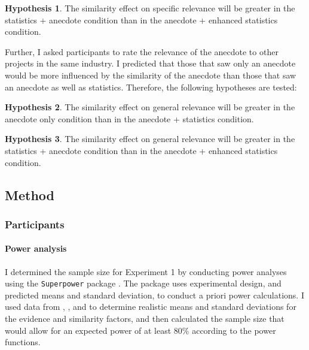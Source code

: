 \documentclass[a4paper, nobind, dvipsnames]{templates/ociamthesis}
\theoremstyle{definition}
\theoremstyle{definition}
\theoremstyle{definition}
\theoremstyle{definition}
\newtheorem{hypothesis}{Hypothesis}[chapter]
\theoremstyle{remark}
\begin{document}
\begin{hypothesis}
\protect\hypertarget{hyp:relevance-specific-enhanced-anecdotes-1}{}{\label{hyp:relevance-specific-enhanced-anecdotes-1} }The similarity effect on specific relevance will be greater in the statistics +
anecdote condition than in the anecdote + enhanced statistics condition.
\end{hypothesis}

Further, I asked participants to rate the relevance of the anecdote to other
projects in the same industry. I predicted that those that saw only an anecdote
would be more influenced by the similarity of the anecdote than those that saw
an anecdote as well as statistics. Therefore, the following hypotheses are
tested:

\begin{hypothesis}
\protect\hypertarget{hyp:relevance-general-anecdotes-1}{}{\label{hyp:relevance-general-anecdotes-1} }The similarity effect on general relevance will be greater in the anecdote only
condition than in the anecdote + statistics condition.
\end{hypothesis}

\begin{hypothesis}
\protect\hypertarget{hyp:relevance-general-enhanced-anecdotes-1}{}{\label{hyp:relevance-general-enhanced-anecdotes-1} }The similarity effect on general relevance will be greater in the statistics +
anecdote condition than in the anecdote + enhanced statistics condition.
\end{hypothesis}

\hypertarget{method-anecdotes-1-appendix}{%
\subsection{Method}\label{method-anecdotes-1-appendix}}

\hypertarget{participants-17}{%
\subsubsection{Participants}\label{participants-17}}

\hypertarget{power-analysis-anecdotes-1}{%
\paragraph{Power analysis}\label{power-analysis-anecdotes-1}}

I determined the sample size for Experiment 1 by conducting power analyses using
the \texttt{Superpower} package \autocite{lakens2019}. The package uses experimental design,
and predicted means and standard deviation, to conduct a priori power
calculations. I used data from \textcite{wainberg2018}, \textcite{jaramillo2019}, and \textcite[Study 3]{hoeken2009} to determine realistic means and standard deviations for the evidence
and similarity factors, and then calculated the sample size that would allow for
an expected power of at least 80\% according to the power functions.
\end{document}
